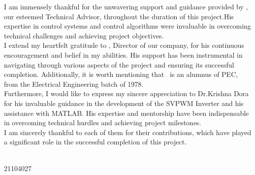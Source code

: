 I am immensely thankful for the unwavering support and guidance provided by
\industry, our esteemed Technical Advisor, throughout the duration of this
project.His expertise in control systems and control algorithms were invaluable
in overcoming technical challenges and achieving project objectives.\\

I extend my heartfelt gratitude to \director, Director of our company, for his
continuous encouragement and belief in my abilities. His support has been
instrumental in navigating through various aspects of the project and ensuring
its successful completion. Additionally, it is worth mentioning that \director\
is an alumnus of PEC, from the Electrical Engineering batch of 1978.\\

Furthermore, I would like to express my sincere appreciation to Dr.Krishna Dora
for his invaluable guidance in the development of the SVPWM Inverter and his
assistance with MATLAB. His expertise and mentorship have been indispensable in
overcoming technical hurdles and achieving project milestones.\\

I am sincerely thankful to each of them for their contributions, which have
played a significant role in the successful completion of this project.

\vfill
\begin{minipage}[t]{1\textwidth}
    \raggedleft
    \name \\ 21104027
\end{minipage}